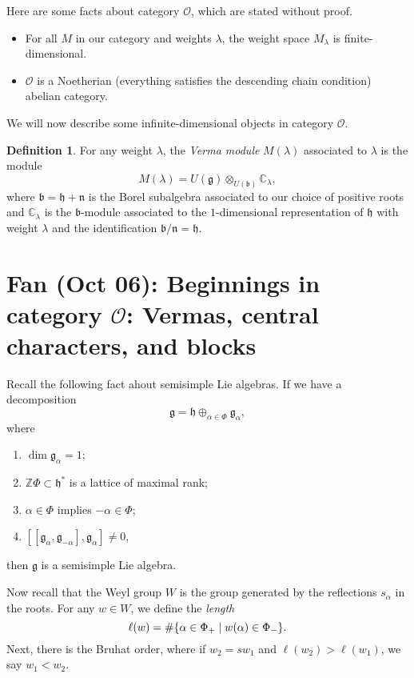 \documentclass[leqno, openany]{memoir}
\theoremstyle{definition}
\newtheorem{defn}[thm]{Definition}
\theoremstyle{remark}
\theoremstyle{plain}
\theoremstyle{definition}
\theoremstyle{remark}
\newcommand{\C}{\mathbb{C}}
\newcommand{\Z}{\mathbb{Z}}
\newcommand{\mc}[1]{\mathcal{#1}}
\newcommand{\mf}[1]{\mathfrak{#1}}
\begin{document}
Here are some facts about category $\mc{O}$, which are stated without proof.
\begin{itemize}
    \item For all $M$ in our category and weights $\lambda$, the weight space $M_{\lambda}$ is finite-dimensional.
    \item $\mc{O}$ is a Noetherian (everything satisfies the descending chain condition) abelian category.
\end{itemize}

We will now describe some infinite-dimensional objects in category $\mc{O}$.

\begin{defn}
    For any weight $\lambda$, the \textit{Verma module} $M(\lambda)$ associated to $\lambda$ is the module
    \[ M(\lambda) = U(\mf{g}) \otimes_{U(\mf{b})} \C_{\lambda}, \]
    where $\mf{b} = \mf{h} + \mf{n}$ is the Borel subalgebra associated to our choice of positive roots and $\C_{\lambda}$ is the $\mf{b}$-module associated to the $1$-dimensional representation of $\mf{h}$ with weight $\lambda$ and the identification $\mf{b} / \mf{n} = \mf{h}$.
\end{defn}

\chapter{Fan (Oct 06): Beginnings in category $\mc{O}$: Vermas, central characters, and blocks}%
\label{cha:fan_oct_06_beginnings_in_category_o_vermas_central_characters_and_blocks}

Recall the following fact ahout semisimple Lie algebras. If we have a decomposition
\[ \mf{g} = \mf{h} \oplus_{\alpha \in \Phi} \mf{g}_{\alpha}, \]
where 
\begin{enumerate}
    \item $\dim \mf{g}_{\alpha} = 1$;
    \item $\Z \Phi \subset \mf{h}^*$ is a lattice of maximal rank;
    \item $\alpha \in \Phi$ implies $-\alpha \in \Phi$;
    \item $[[\mf{g}_{\alpha}, \mf{g}_{-\alpha}], \mf{g}_{\alpha}] \neq 0$,
\end{enumerate}
then $\mf{g}$ is a semisimple Lie algebra.

Now recall that the Weyl group $W$ is the group generated by the reflections $s_{\alpha}$ in the roots. For any $w \in W$, we define the \textit{length} 
\[ \ell(w) = \# \qty{\alpha \in \Phi_+ \mid w(\alpha) \in \Phi_-}. \]
Next, there is the Bruhat order, where if $w_2 = s w_1$ and $\ell(w_2) > \ell(w_1)$, we say $w_1 < w_2$.
\end{document}
